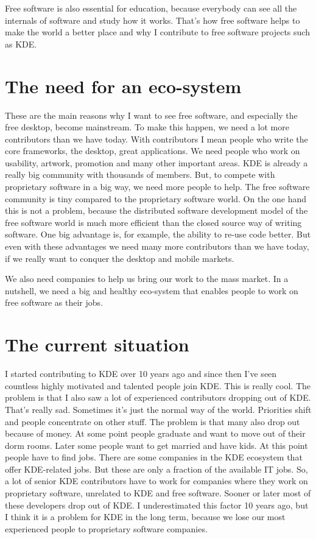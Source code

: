 Free software is also essential for education, because everybody can see all the internals of software and study how it works. That’s how free software helps to make the world a better place and why I contribute to free software projects such as KDE. 


\section*{The need for an eco-system}

These are the main reasons why I want to see free software, and especially the free desktop, become mainstream. To make this happen, we need a lot more contributors than we have today. With contributors I mean people who write the core frameworks, the desktop, great applications. We need people who work on usability, artwork, promotion and many other important areas. KDE is already a really big community with thousands of members. But, to compete with proprietary software in a big way, we need more people to help. The free software community is tiny compared to the proprietary software world. On the one hand this is not a problem, because the distributed software development model of the free software world is much more efficient than  the closed source way of writing software. One big advantage is, for example, the ability to re-use code better. But even with these advantages we need many more contributors than we have today, if we really want to conquer the desktop and mobile markets.

We also need companies to help us bring our work to the mass market. In a nutshell, we need a big and healthy eco-system that enables people to work on free software as their jobs.


\section*{The current situation}

I started contributing to KDE over 10 years ago and since then I’ve seen countless highly motivated and talented people join KDE. This is really cool. The problem is that I also saw a lot of experienced contributors dropping out of KDE. That’s really sad. Sometimes it’s just the normal way of the world. Priorities shift and people concentrate on other stuff. The problem is that many also drop out because of money. At some point people graduate and want to move out of their dorm rooms. Later some people want to get married and have kids. At this point people have to find jobs. There are some companies in the KDE ecosystem that offer KDE-related jobs. But these are only a fraction of the available IT jobs. So, a lot of senior KDE contributors have to work for companies where they  work on proprietary software, unrelated to KDE and free software. Sooner or later most of these developers drop out of KDE.
I underestimated this factor 10 years ago, but I think it is a problem for KDE in the long term, because we lose our most experienced people to proprietary software companies.

